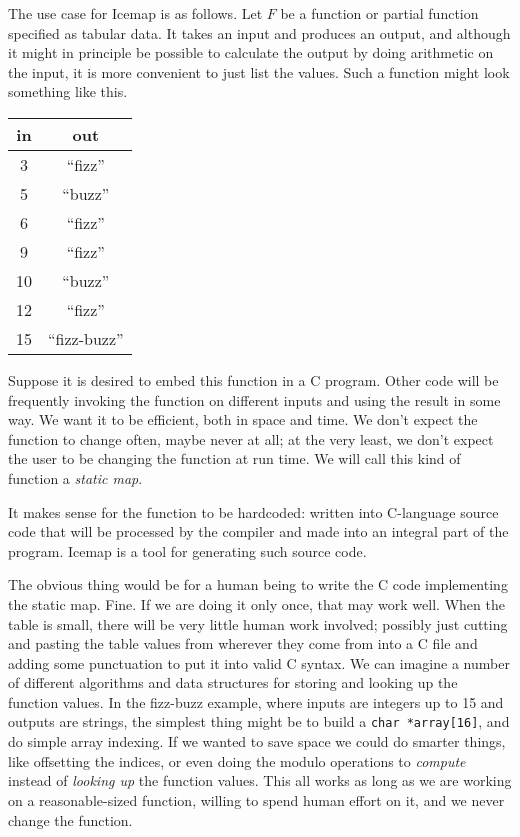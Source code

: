 \documentclass{mitsuba}
\begin{document}
The use case for Icemap is as follows.  Let $F$ be a function or partial
function specified as tabular data.  It takes an input and produces an
output, and although it might in principle be possible to calculate the
output by doing arithmetic on the input, it is more convenient to just list
the values.  Such a function might look something like this.

{\hspace*{\fill}\begin{tabular}{c|c}
  in & out \\ \hline
  3 & ``fizz'' \\
  5 & ``buzz'' \\
  6 & ``fizz'' \\
  9 & ``fizz'' \\
  10 & ``buzz'' \\
  12 & ``fizz'' \\
  15 & ``fizz-buzz''
\end{tabular}\hspace*{\fill}\par}

Suppose it is desired to embed this function in a C program.  Other code
will be frequently invoking the function on different inputs and using the
result in some way.  We want it to be efficient, both in space and time.  We
don't expect the function to change often, maybe never at all; at the very
least, we don't expect the user to be changing the function at run time.  We
will call this kind of function a \emph{static map}. 

It makes sense for the function to be hardcoded:  written into C-language
source code that will be processed by the compiler and made into an integral
part of the program.  Icemap is a tool for generating such source code.

The obvious thing would be for a human being to write the C code
implementing the static map.  Fine.  If we are doing it only once, that may
work well.  When the table is small, there will be very little human work
involved; possibly just cutting and pasting the table values from wherever
they come from into a C file and adding some punctuation to put it into
valid C syntax.  We can imagine a number of different algorithms and data
structures for storing and looking up the function values.  In the fizz-buzz
example, where inputs are integers up to 15 and outputs are strings, the
simplest thing might be to build a \texttt{char *array[16]}, and do simple
array indexing.  If we wanted to save space we could do smarter things, like
offsetting the indices, or even doing the modulo operations to
\emph{compute} instead of \emph{looking up} the function values.  This
all works as long as we are working on a reasonable-sized function,
willing to spend human effort on it, and we never change the function.
\end{document}
